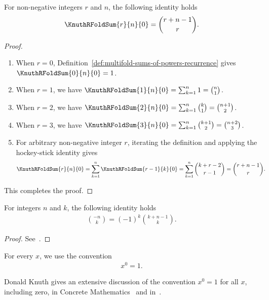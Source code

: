\begin{lemma}
  \label{lem:multifold-sum-of-zero-powers}
  For non-negative integers $r$ and $n$, the following identity holds
  \begin{align*}
    \KnuthRFoldSum{r}{n}{0} = \binom{r+n-1}{r}.
  \end{align*}
  \begin{proof}
    \leavevmode\par
    \begin{enumerate}
      \item When $r=0$, Definition~\ref{def:multifold-sums-of-powers-recurrence} gives $\KnuthRFoldSum{0}{n}{0} = 1$.
      \item When $r=1$, we have
        $\KnuthRFoldSum{1}{n}{0}
        = \sum_{k=1}^{n} 1 = \binom{n}{1}$.
      \item When $r=2$, we have
        $\KnuthRFoldSum{2}{n}{0}
        = \sum_{k=1}^{n} \binom{k}{1}
        = \binom{n+1}{2}$.
      \item When $r=3$, we have
        $\KnuthRFoldSum{3}{n}{0}
        = \sum_{k=1}^{n} \binom{k+1}{2}
        = \binom{n+2}{3}$.
      \item For arbitrary non-negative integer $r$, iterating the definition and applying the hockey-stick identity gives
        \begin{align*}
          \KnuthRFoldSum{r}{n}{0}
          &= \sum_{k=1}^{n} \KnuthRFoldSum{r-1}{k}{0}
          = \sum_{k=1}^{n} \binom{k+r-2}{r-1}
          = \binom{r+n-1}{r}.
        \end{align*}
    \end{enumerate}
    This completes the proof.
  \end{proof}
\end{lemma}

\begin{lemma}
  \label{lem:upper-binomial-negation}
  For integers $n$ and $k$, the following identity holds
  \begin{align*}
    \binom{-n}{k} = (-1)^{k} \binom{k+n-1}{k}.
  \end{align*}
  \begin{proof}
    See~\cite[p. 164, Equation (5.14)]{graham1994concrete}.
  \end{proof}
\end{lemma}

\begin{convention} For every $x$, we use the convention
  \begin{align*}
    x^0 = 1.
  \end{align*}
\end{convention}
Donald Knuth gives an extensive discussion of the convention $x^0=1$ for
all $x$, including zero, in Concrete Mathematics~\cite[p. 162]{graham1994concrete}
and in~\cite{knuth1992notesnotation}.
